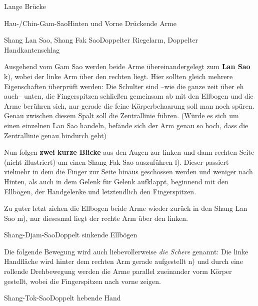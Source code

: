 \begin{WTSatz}{Lange Br\"ucke}
\begin{WTSatzTeil}{Hau-/Chin-Gam-Sao}{Hinten und Vorne Dr\"uckende Arme}
	\end{WTSatzTeil}
	\begin{WTSatzTeil}{Shang Lan Sao, Shang Fak Sao}{Doppelter Riegelarm, Doppelter Handkantenschlag}
		
		Ausgehend vom Gam Sao werden beide Arme \"ubereinandergelegt zum \textbf{Lan Sao} k), wobei der linke Arm \"uber den rechten liegt. Hier sollten gleich mehrere Eigenschaften \"uberpr\"uft werden: Die Schulter sind --wie die ganze zeit \"uber eh auch-- unten, die Fingerspitzen schlie{\ss}en gemeinsam ab mit den Ellbogen und die Arme ber\"uhren sich, nur gerade die feine K\"orperbehaarung soll man noch sp\"uren. Genau zwischen diesem Spalt soll die Zentrallinie f\"uhren. (W\"urde es sich um einen einzelnen Lan Sao handeln, bef\"ande sich der Arm genau so hoch, dass die Zentrallinie genau hindurch geht)
		
		Nun folgen \textbf{zwei kurze Blicke} aus den Augen zur linken und dann rechten Seite (nicht illustriert) um einen Shang Fak Sao auszuf\"uhren l). Dieser passiert vielmehr in dem die Finger zur Seite hinaus geschossen werden und weniger nach Hinten, als auch in dem Gelenk f\"ur Gelenk aufklappt, beginnend mit den Ellbogen, der Handgelenke und letztendlich den Fingerspitzen.
		
		Zu guter letzt ziehen die Ellbogen beide Arme wieder zur\"uck in den Shang Lan Sao m), nur diesesmal liegt der rechte Arm \"uber den linken.
		
	\end{WTSatzTeil}
	\begin{WTSatzTeil}{Shang-Djam-Sao}{Doppelt sinkende Ellb\"ogen}
		
		Die folgende Bewegung wird auch liebevollerweise \textit{die Schere} genannt: Die linke Handfl\"ache wird hinter dem rechten Arm gerade aufgestellt n) und durch eine rollende Drehbewegung werden die Arme parallel zueinander vorm K\"orper gestellt, wobei die Fingerspitzen nach vorne zeigen.
		
	\end{WTSatzTeil}
	
	\def\WTFormenSNTLetter#1{\texttt{#1}}
	
	\begin{WTSatzTeil}{Shang-Tok-Sao}{Doppelt hebende Hand}
		

\end{WTSatzTeil}
\end{WTSatz}
